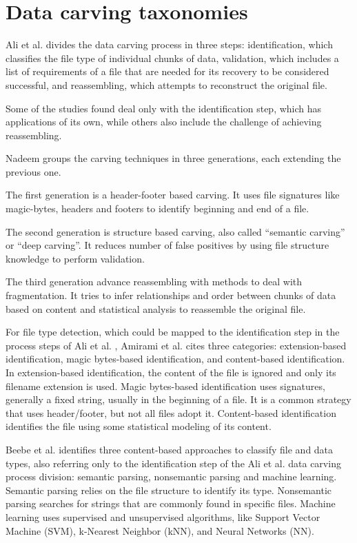 \section{Data carving taxonomies}

Ali et al. \cite{ali_review_2018} divides the data carving process in three steps:
    identification, which classifies the file type of individual chunks of data, 
    validation, which includes a list of requirements of a file that are needed for its recovery to be considered successful, and
    reassembling, which attempts to reconstruct the original file.

Some of the studies found deal only with the identification step, which has applications of its own, while others also include the challenge of achieving reassembling.

Nadeem \cite{nadeem_ashraf_forensic_2013} groups the carving techniques in three generations, each extending the previous one.

The first generation is a header-footer based carving. It uses file signatures like magic-bytes, headers and footers to identify beginning and end of a file.

The second generation is structure based carving, also called ``semantic carving'' or ``deep carving''. It reduces number of false positives by using file structure knowledge to perform validation.

The third generation advance reassembling with methods to deal with fragmentation. It tries to infer relationships and order between chunks of data based on content and statistical analysis to reassemble the original file.

For file type detection, which could be mapped to the identification step in the  process steps of Ali et al. \cite{ali_review_2018}, Amirami et al. \cite{amirani_new_2008} cites three categories: extension-based identification, magic bytes-based identification, and content-based identification.
In extension-based identification, the content of the file is ignored and only its filename extension is used. Magic bytes-based identification uses signatures, generally a fixed string, usually in the beginning of a file. It is a common strategy that uses header/footer, but not all files adopt it. Content-based identification identifies the file using some statistical modeling of its content.

Beebe et al. \cite{beebe_sceadan:_2013} identifies three content-based approaches to classify file and data types, also referring only to the identification step of the Ali et al. \cite{ali_review_2018} data carving process division: semantic parsing, nonsemantic parsing and machine learning. Semantic parsing relies on the file structure to identify its type. Nonsemantic parsing searches for strings that are commonly found in specific files. Machine learning uses supervised and unsupervised algorithms, like Support Vector Machine (SVM), k-Nearest Neighbor (kNN), and Neural Networks (NN).

